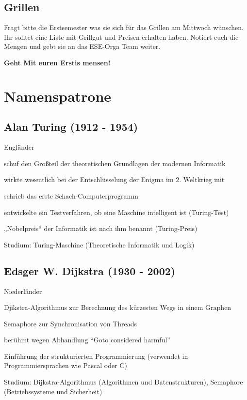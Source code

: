 \documentclass[a4paper,12pt]{report}
\begin{document}
\section{Grillen}
Fragt bitte die Erstsemester was sie sich für das Grillen am Mittwoch wünschen. Ihr solltet eine Liste mit Grillgut und Preisen erhalten haben. Notiert euch die Mengen und gebt sie an das ESE-Orga Team weiter.


\bigskip
\bigskip
\begin{center}
\huge{\textbf{Geht Mit euren Erstis mensen!}}
\end{center}
\chapter{Namenspatrone}
\section*{Alan Turing (1912 - 1954)}
\begin{itemize*}
    \item Engländer
    \item schuf den Großteil der theoretischen Grundlagen der modernen Informatik
    \item wirkte wesentlich bei der Entschlüsselung der Enigma im 2. Weltkrieg mit
    \item schrieb das erste Schach-Computerprogramm
    \item entwickelte ein Testverfahren, ob eine Maschine intelligent ist (Turing-Test)
    \item „Nobelpreis“ der Informatik ist nach ihm benannt (Turing-Preis)
    \item Studium: Turing-Maschine (Theoretische Informatik und Logik)
\end{itemize*}

\section*{Edsger W. Dijkstra (1930 - 2002)}
\begin{itemize*}
    \item Niederländer
    \item Djikstra-Algorithmus zur Berechnung des kürzesten Wegs in einem Graphen
    \item Semaphore zur Synchronisation von Threads
    \item berühmt wegen Abhandlung ``Goto considered harmful''
    \item Einführung der strukturierten Programmierung (verwendet in Programmiersprachen wie
          Pascal oder C)
    \item Studium: Dijkstra-Algorithmus (Algorithmen und Datenstrukturen), Semaphore
          (Betriebssysteme und Sicherheit)
\end{itemize*}
\end{document}
